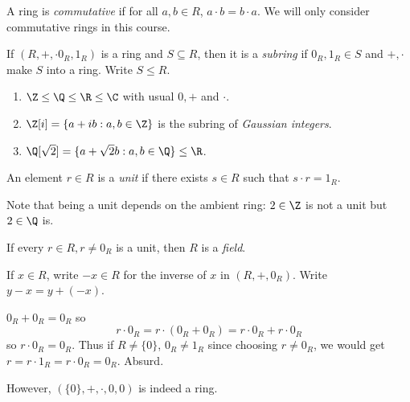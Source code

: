 \documentclass[a4paper]{article}
\theoremstyle{definition}
\begin{document}
A ring is \emph{commutative} if for all \(a, b\in R\), \(a \cdot b = b \cdot a\). We will only consider commutative rings in this course.

\begin{definition}[Subring]
  If \((R, +, \cdot 0_R, 1_R)\) is a ring and \(S \subseteq R\), then it is a \emph{subring} if \(0_R, 1_R \in S\) and \(+, \cdot\) make \(S\) into a ring. Write \(S \leq R\).
\end{definition}

\begin{eg}\leavevmode
  \begin{enumerate}
  \item \(\Z \leq \Q \leq \R \leq \C\) with usual \(0, +\) and \(\cdot\).
  \item \(\Z[i] = \{a + ib: a, b \in \Z\}\) is the subring of \emph{Gaussian integers}.
  \item \(\Q[\sqrt 2] = \{a + \sqrt 2 b: a, b \in \Q\} \leq \R\).
  \end{enumerate}
\end{eg}

\begin{definition}[Unit]
  An element \(r \in R\) is a \emph{unit} if there exists \(s \in R\) such that \(s \cdot r = 1_R\).
\end{definition}

Note that being a unit depends on the ambient ring: \(2 \in \Z\) is not a unit but \(2 \in \Q\) is.

If every \(r \in R, r \neq 0_R\) is a unit, then \(R\) is a \emph{field}.

\begin{notation}
  If \(x \in R\), write \(-x \in R\) for the inverse of \(x\) in \((R, +, 0_R)\). Write \(y - x = y + (-x)\).
\end{notation}

\begin{eg}
  \(0_R + 0_R = 0_R\) so
  \[
    r \cdot 0_R = r \cdot (0_R + 0_R) = r \cdot 0_R + r \cdot 0_R
  \]
  so \(r \cdot 0_R = 0_R\). Thus if \(R \neq \{0\}\), \(0_R \neq 1_R\) since choosing \(r \neq 0_R\), we would get \(r = r \cdot 1_R = r \cdot 0_R = 0_R\). Absurd.

  However, \((\{0\}, +, \cdot, 0, 0)\) is indeed a ring.
\end{eg}
\end{document}
